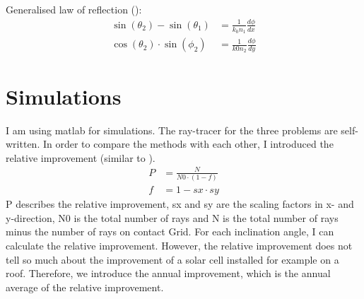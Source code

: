 Generalised law of reflection (\cite{yu2014flat}):
\begin{align*}
\sin(\theta_2) - \sin(\theta_1) &=\frac{1}{k_0 n_1} \frac{d \phi}{dx} \\
\cos(\theta_2) \cdot \sin(\phi_2) &=\frac{1}{k0 n_2} \frac{d \phi}{dy}
\end{align*}

\section{Simulations}
I am using matlab for simulations. The ray-tracer for the three problems are self-written. In order to compare the methods with each other, I introduced the relative improvement (similar to \cite{schumann2015cloaked} ). 
\begin{align*}
P&=\frac{N}{N0 \cdot (1-f) } \\
f&= 1-sx \cdot sy
\end{align*}
P describes the relative improvement, sx and sy are the scaling factors in x- and y-direction, N0 is the total number of rays and N is the total number of rays minus the number of rays on contact Grid.
For each inclination angle, I can calculate the relative improvement. However, the relative improvement does not tell so much about the improvement of a solar cell installed for example on a roof. Therefore, we introduce the annual improvement, which is the annual average of the relative improvement. 

